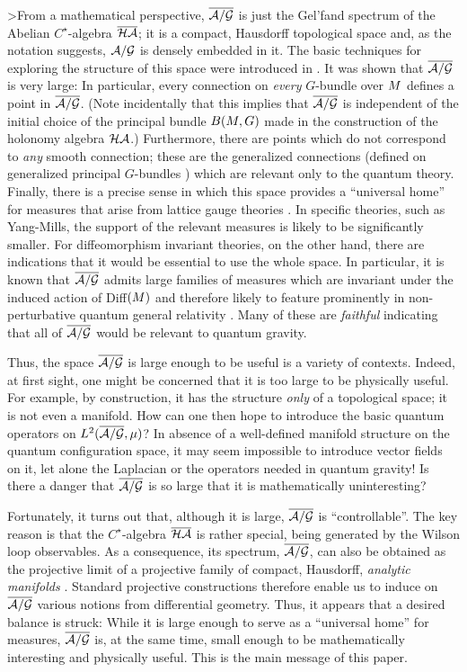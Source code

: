 >From a mathematical perspective, $\agb$ is just the Gel'fand spectrum
of the Abelian $C^\star$-algebra $\HAbar$; it is a compact, Hausdorff
topological space and, as the notation suggests, $\ag$ is densely
embedded in it.  The basic techniques for exploring the structure of
this space were introduced in \cite{AL1}. It was shown that $\agb$ is
very large: In particular, every connection on {\it every}
$G$-bundle over $\S$ defines a point in $\agb$. (Note incidentally
that this implies that $\agb$ is independent of the initial choice of
the principal bundle $B(\S, G)$ made in the construction of the
holonomy algebra $\HA$.)  Furthermore, there are points which do not
correspond to {\it any} smooth connection; these are the generalized
connections (defined on generalized principal $G$-bundles \cite{Le})
which are relevant only to the quantum theory.  Finally, there is a
precise sense in which this space provides a ``universal home'' for
measures that arise from lattice gauge theories \cite{AMM}. In
specific theories, such as Yang-Mills, the support of the relevant
measures is likely to be significantly smaller. For diffeomorphism
invariant theories, on the other hand, there are indications that it
would be essential to use the whole space. In particular, it is known
that $\agb$ admits large families of measures which are invariant
under the induced action of Diff$(\S)$ \cite{AL1, B1, B2, ALMMT2,AL2}
and therefore likely to feature prominently in non-perturbative
quantum general relativity \cite{ALMMT2, AA2}. Many of these are {\it
faithful} indicating that all of $\agb$ would be relevant to quantum
gravity.
 
Thus, the space $\agb$ is large enough to be useful is a variety of
contexts. Indeed, at first sight, one might be concerned that it is
too large to be physically useful. For example, by construction, it
has the structure {\it only} of a topological space; it is not even a
manifold.  How can one then hope to introduce the basic quantum
operators on $L^2(\agb, \mu)$?  In absence of a well-defined manifold
structure on the quantum configuration space, it may seem impossible
to introduce vector fields on it, let alone the Laplacian or the
operators needed in quantum gravity! Is there a danger that $\agb$ is
so large that it is mathematically uninteresting?

Fortunately, it turns out that, although it is large, $\agb$ is
``controllable''. The key reason is that the $C^\star$-algebra
$\HAbar$ is rather special, being generated by the Wilson loop
observables. As a consequence, its spectrum, $\agb$, can also be
obtained as the projective limit of a projective family of compact,
Hausdorff, {\it analytic manifolds} \cite{AL1, B1, B2, MM,
AL2}. Standard projective constructions therefore enable us to induce
on $\agb$ various notions from differential geometry.  Thus, it
appears that a desired balance is struck: While it is large enough to
serve as a ``universal home'' for measures, $\agb$ is, at the same
time, small enough to be mathematically interesting and physically
useful. This is the main message of this paper.

